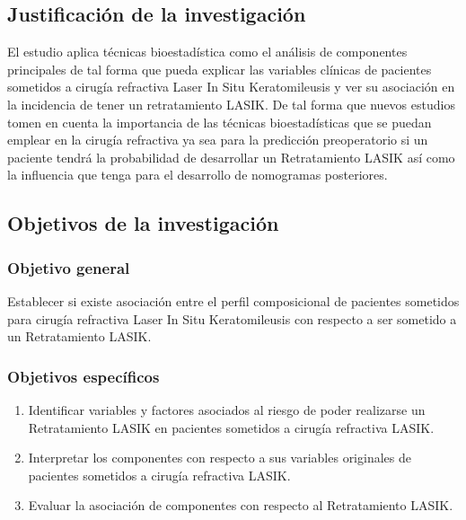 
\subsection{Justificación de la investigación}
El estudio aplica técnicas bioestadística como el análisis de componentes principales de tal forma que pueda explicar las variables clínicas de pacientes sometidos a cirugía refractiva Laser In Situ Keratomileusis y ver su asociación en la incidencia de tener un retratamiento LASIK. De tal forma que nuevos estudios tomen en cuenta la importancia de las técnicas bioestadísticas que se puedan emplear en la cirugía refractiva ya sea para la predicción preoperatorio si un paciente tendrá la probabilidad de desarrollar un Retratamiento LASIK así como la influencia que tenga para el desarrollo de nomogramas posteriores.
 

\subsection{Objetivos de la investigación}

\subsubsection{Objetivo general}
Establecer si existe asociación entre el perfil composicional de pacientes sometidos para cirugía refractiva Laser In Situ Keratomileusis con respecto a ser sometido a un Retratamiento LASIK.

\subsubsection{Objetivos específicos}
\begin{enumerate}
\item 	Identificar variables y factores asociados al riesgo de poder realizarse un Retratamiento LASIK en pacientes sometidos a cirugía refractiva LASIK.
\item   Interpretar los componentes con respecto a sus variables originales de pacientes sometidos a cirugía refractiva LASIK.
\item Evaluar la asociación de componentes con respecto al Retratamiento LASIK.
\end{enumerate}




